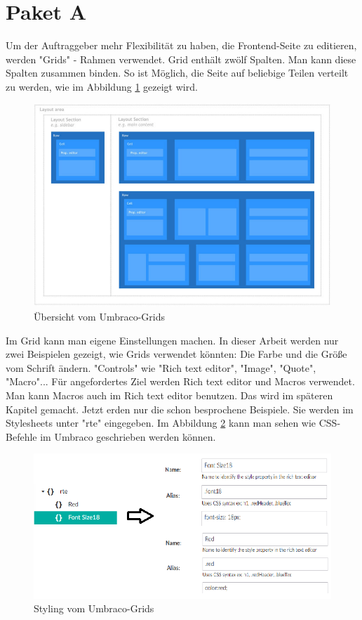 \pagebreak
\section{Paket A}
Um der Auftraggeber mehr Flexibilität zu haben, die Frontend-Seite zu editieren, werden "Grids" - Rahmen verwendet. Grid enthält zwölf Spalten. Man kann diese Spalten zusammen binden. So ist Möglich, die Seite auf beliebige Teilen verteilt zu werden, wie im Abbildung \ref{fig:GridsLayout} gezeigt wird.

\begin{figure}[h]
	\centering
	\includegraphics[width=1\linewidth]{Graphics/GridsLayout.png}
	\caption[GridsLayout]{Übersicht vom Umbraco-Grids}
	\label{fig:GridsLayout}
\end{figure}

 Im Grid kann man eigene Einstellungen machen. In dieser Arbeit werden nur zwei Beispielen gezeigt, wie Grids verwendet könnten: Die Farbe und die Größe vom Schrift ändern. "Controls" wie "Rich text editor", "Image", "Quote", "Macro"... Für angefordertes Ziel werden Rich text editor und Macros verwendet. Man kann Macros auch im Rich text editor benutzen. Das wird im späteren Kapitel gemacht. Jetzt erden nur die schon besprochene Beispiele. Sie werden im Stylesheets unter "rte" eingegeben. Im Abbildung \ref{fig:StylingGrind} kann man sehen wie CSS-Befehle im Umbraco geschrieben werden können.
     
     \begin{figure}[h]
     	\centering
     	\includegraphics[width=0.6\linewidth]{Graphics/StylingGrind.png}
     	\caption[StylingGrind]{Styling vom Umbraco-Grids}
     	\label{fig:StylingGrind}
     \end{figure}
     

